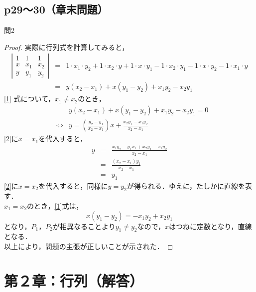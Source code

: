 \documentclass[dvipdfmx,uplatex,11pt]{jsarticle}
\begin{document}
\subsection{p29〜30（章末問題）}
%
%
%
問2\\
\noindent
\begin{leftbar}
\begin{proof}
実際に行列式を計算してみると，
\begin{eqnarray}
\left |
\begin{array}{ccc}
1 & 1 & 1 \\
x & x_1 & x_2 \\
y & y_1 & y_2 
\end{array}
\right |
& = & 1 \cdot x_1 \cdot y_2 +1 \cdot x_2 \cdot y + 1 \cdot x \cdot y_1 - 1 \cdot x_2 \cdot y_1 - 1 \cdot x \cdot y_2 - 1 \cdot x_1 \cdot y \\
\label{1}
& = & y(x_2 -x_1) + x ( y_1 - y_2 ) +x_1 y_2 - x_2 y_1
\end{eqnarray}
\eqref{1} 式について，$x_1 \neq x_2$のとき，
\begin{eqnarray}
& & y(x_2 -x_1) + x ( y_1 - y_2 ) +x_1 y_2 - x_2 y_1=0 \\
\label{2}
& \Leftrightarrow & y=  \left( \frac{y_2 - y_1}{x_2 -x_1} \right)x  + \frac{x_2 y_1 - x_1 y_2 }{x_2 -x_1}
\end{eqnarray}
\eqref{2}に$x=x_1$を代入すると，
\begin{eqnarray}
y&=& \frac{x_1 y_2 -y_1 x_1 +x_2 y_1 - x_1 y_2}{x_2-x_1} \\
& = & \frac{(x_2 - x_1)y_1}{x_2 - x_1} \\
&=&y_1
\end{eqnarray}
\eqref{2}に$x=x_2$を代入すると，同様に$y=y_2$が得られる．ゆえに，たしかに直線を表す．\\
$x_1 = x_2$のとき，\eqref{1}式は，
\begin{equation}
x(y_1 - y_2) = -x_1 y_2 + x_2 y_1
\end{equation}
となり，$P_1$，$P_2$が相異なることより$y_1 \neq y_2$なので，$x$はつねに定数となり，直線となる．\\
以上により，問題の主張が正しいことが示された．
\end{proof}
\end{leftbar}

\newpage
%
%
%
\section{第２章：行列（解答）}
\end{document}

